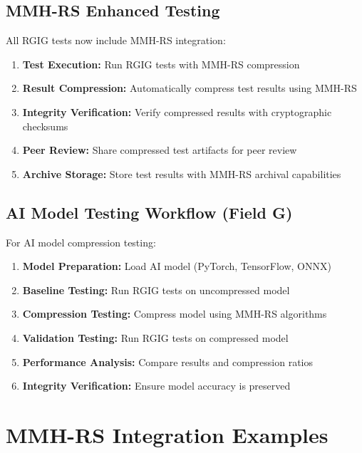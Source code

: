 \documentclass[11pt]{article}
\makeatletter
\newcommand{\inputnolabel}[1]{%
  \let\saved@label\label
  \let\label\@gobble
  \let\label\saved@label
}
\makeatother
\begin{document}
\subsection*{MMH-RS Enhanced Testing}
All RGIG tests now include MMH-RS integration:

\begin{enumerate}
  \item \textbf{Test Execution:} Run RGIG tests with MMH-RS compression
  \item \textbf{Result Compression:} Automatically compress test results using MMH-RS
  \item \textbf{Integrity Verification:} Verify compressed results with cryptographic checksums
  \item \textbf{Peer Review:} Share compressed test artifacts for peer review
  \item \textbf{Archive Storage:} Store test results with MMH-RS archival capabilities
\end{enumerate}

\subsection*{AI Model Testing Workflow (Field G)}
For AI model compression testing:

\begin{enumerate}
  \item \textbf{Model Preparation:} Load AI model (PyTorch, TensorFlow, ONNX)
  \item \textbf{Baseline Testing:} Run RGIG tests on uncompressed model
  \item \textbf{Compression Testing:} Compress model using MMH-RS algorithms
  \item \textbf{Validation Testing:} Run RGIG tests on compressed model
  \item \textbf{Performance Analysis:} Compare results and compression ratios
  \item \textbf{Integrity Verification:} Ensure model accuracy is preserved
\end{enumerate}

\inputnolabel{fieldA}
\inputnolabel{fieldB}
\inputnolabel{fieldC}
\inputnolabel{fieldD}
\inputnolabel{fieldE}
\inputnolabel{fieldF}
\inputnolabel{fieldG}

\section*{MMH-RS Integration Examples}
\end{document}
